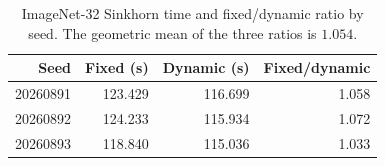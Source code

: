 \begin{table}[t]
\centering
\caption{ImageNet-32 Sinkhorn time and fixed/dynamic ratio by seed. The geometric mean of the three ratios is $1.054$.}
\label{tab:imagenet-solver-pairs}
\small
\begin{tabular}{@{}rrrr@{}}
\toprule
Seed & Fixed (s) & Dynamic (s) & Fixed/dynamic \\
\midrule
20260891 & 123.429 & 116.699 & 1.058 \\
20260892 & 124.233 & 115.934 & 1.072 \\
20260893 & 118.840 & 115.036 & 1.033 \\
\bottomrule
\end{tabular}
\end{table}
